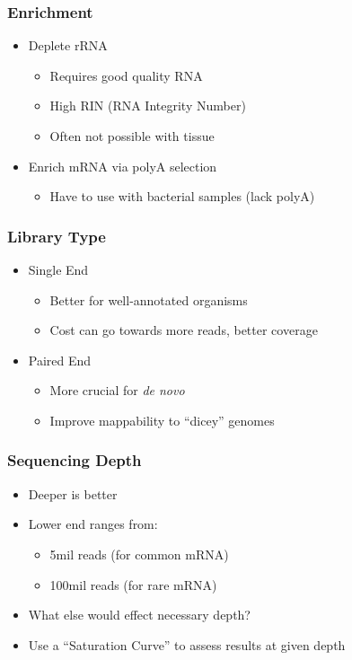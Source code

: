 \documentclass[14pt]{beamer}
\begin{document}
\begin{frame}
\frametitle{Enrichment}
\begin{itemize}
	\item<1-> Deplete rRNA
	\begin{itemize}
		\item<3-> Requires good quality RNA
		\item<4-> High RIN (RNA Integrity Number)
		\item<5-> Often not possible with tissue
	\end{itemize}
	\item<2-> Enrich mRNA via polyA selection
	\begin{itemize}
		\item<6-> Have to use with bacterial samples (lack polyA)
	\end{itemize}	
\end{itemize}
\end{frame}

\begin{frame}
\frametitle{Library Type}
\begin{itemize}
	\item<1-> Single End
	\begin{itemize}
		\item<3-> Better for well-annotated organisms
		\item<4-> Cost can go towards more reads, better coverage
	\end{itemize}
	\item<2-> Paired End
	\begin{itemize}
		\item<5-> More crucial for \textit{de novo}
		\item<6-> Improve mappability to ``dicey'' genomes
	\end{itemize}	
\end{itemize}
\end{frame}

\begin{frame}
\frametitle{Sequencing Depth}
\begin{itemize}
	\item<1-> Deeper is better
	\item<2-> Lower end ranges from:
	\begin{itemize}
		\item<3-> 5mil reads (for common mRNA)
		\item<4-> 100mil reads (for rare mRNA)
	\end{itemize}
	\item<5-> What else would effect necessary depth?
	\item<7-> Use a ``Saturation Curve'' to assess results at given depth
\end{itemize}
\end{frame}
\end{document}
